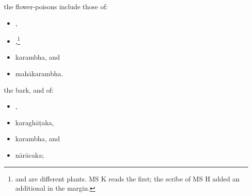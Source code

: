 \begin{translation}
        \item
        the flower-poisons include those of:
\begin{itemize}
 \item {}, 
 \item {},\footnote{ and  are 
 different plants. MS K reads the first; the scribe of MS H added an additional 
  in the margin.}
        \item \gls{karambha},
        and
        \item \gls{mahākarambha}.
\end{itemize}

        \item
        the bark,  and  of:
\begin{itemize}
        \item {},
        \item \gls{karaghāṭaka},
        \item \gls{karambha},
        and
        \item \gls{nārācaka};
            \end{itemize}
 

\end{translation}
